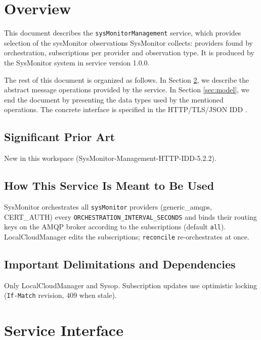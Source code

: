 \documentclass[a4paper]{arrowhead}
\begin{document}
\section{Overview}
\label{sec:overview}

This document describes the \texttt{sys\allowbreak{}Monitor\allowbreak{}Management} service, which provides selection of the sysMonitor observations SysMonitor collects: providers found by orchestration, subscriptions per provider and observation type.
It is produced by the SysMonitor system \cite{smo-sysd} in service version 1.0.0.

The rest of this document is organized as follows.
In Section \ref{sec:operations}, we describe the abstract message operations provided by the service.
In Section \ref{sec:model}, we end the document by presenting the data types used by the mentioned operations.
The concrete interface is specified in the HTTP/TLS/JSON IDD \cite{smo-sysMonitorManagement-http-idd}.

\subsection{Significant Prior Art}

New in this workspace (SysMonitor-Management-HTTP-IDD-5.2.2).

\subsection{How This Service Is Meant to Be Used}

SysMonitor orchestrates all \texttt{sysMonitor} providers (generic\_amqps, CERT\_AUTH) every \texttt{ORCHESTRATION\_\allowbreak{}INTERVAL\_\allowbreak{}SECONDS} and binds their routing keys on the AMQP broker according to the subscriptions (default \texttt{all}). LocalCloudManager edits the subscriptions; \texttt{reconcile} re-orchestrates at once.

\subsection{Important Delimitations and Dependencies}
\label{sec:delimitations}

Only LocalCloudManager and Sysop. Subscription updates use optimistic locking (\texttt{If-\allowbreak{}Match} revision, 409 when stale).

\newpage

\section{Service Interface}
\label{sec:operations}
\end{document}
